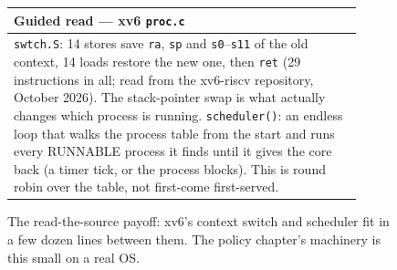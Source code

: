 \begin{figure}[htbp]
\centering
\begin{tabular}{p{0.9\linewidth}}
\toprule
Guided read --- xv6 \texttt{proc.c} \\
\midrule
\texttt{swtch.S}: 14 stores save \texttt{ra}, \texttt{sp} and
\texttt{s0}--\texttt{s11} of the old context, 14 loads restore the
new one, then \texttt{ret} (29 instructions in all; read from the
xv6-riscv repository, October 2026). The stack-pointer swap is what
actually changes which process is running.
\texttt{scheduler()}: an endless loop that walks the process table
from the start and runs every RUNNABLE process it finds until it
gives the core back (a timer tick, or the process blocks).
This is round robin over the table, not first-come first-served. \\
\bottomrule
\end{tabular}
\caption{The read-the-source payoff: xv6's context switch and
scheduler fit in a few dozen lines between them. The policy
chapter's machinery is this small on a real OS.}
\label{fig:xv6_12}
\end{figure}
